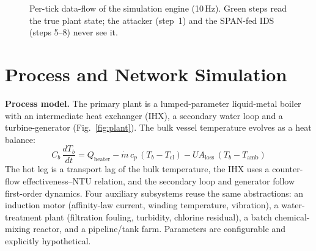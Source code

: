 \documentclass[conference]{IEEEtran}
\begin{document}
\begin{figure}[t]
\centering
{}
\caption{Per-tick data-flow of the simulation engine (10\,Hz). Green steps read the true plant state; the attacker (step~1) and the SPAN-fed IDS (steps 5--8) never see it.}
\label{fig:flow}
\end{figure}

\section{Process and Network Simulation}
\textbf{Process model.} The primary plant is a lumped-parameter liquid-metal boiler with an intermediate heat exchanger (IHX), a secondary water loop and a turbine-generator (Fig.~\ref{fig:plant}). The bulk vessel temperature evolves as a heat balance:
\begin{equation}
C_b\,\frac{dT_b}{dt}=Q_{\text{heater}}-\dot{m}\,c_p\,(T_b-T_{\text{cl}})-UA_{\text{loss}}\,(T_b-T_{\text{amb}})
\end{equation}
The hot leg is a transport lag of the bulk temperature, the IHX uses a counter-flow effectiveness--NTU relation, and the secondary loop and generator follow first-order dynamics. Four auxiliary subsystems reuse the same abstractions: an induction motor (affinity-law current, winding temperature, vibration), a water-treatment plant (filtration fouling, turbidity, chlorine residual), a batch chemical-mixing reactor, and a pipeline/tank farm. Parameters are configurable and explicitly hypothetical.
\end{document}
